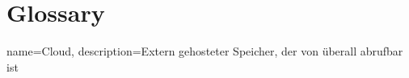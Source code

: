 \chapter{Glossary}

{
    name=Cloud,
    description={Extern gehosteter Speicher, der von überall abrufbar ist}
}

\printglossaries
